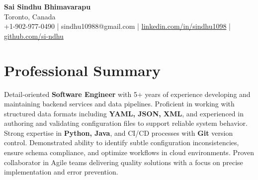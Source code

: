 \documentclass[letterpaper,11pt]{article}
\begin{document}
\begin{center}
  {\Large \textbf{Sai Sindhu Bhimavarapu}} \\
  Toronto, Canada \\
  +1-902-977-0490 \enspace | \enspace sindhu10988@gmail.com \enspace | \enspace \href{https://www.linkedin.com/in/sindhu1098/}{linkedin.com/in/sindhu1098} \enspace | \enspace \href{https://github.com/si-ndhu}{github.com/si-ndhu}
\end{center}

\section{Professional Summary}
  \begin{itemize}[leftmargin=0.15in, label={}]
    \small{\item{
     Detail-oriented \textbf{Software Engineer} with 5+ years of experience developing and maintaining backend services and data pipelines. Proficient in working with structured data formats including \textbf{YAML, JSON, XML}, and experienced in authoring and validating configuration files to support reliable system behavior. Strong expertise in \textbf{Python, Java}, and CI/CD processes with \textbf{Git} version control. Demonstrated ability to identify subtle configuration inconsistencies, ensure schema compliance, and optimize workflows in cloud environments. Proven collaborator in Agile teams delivering quality solutions with a focus on precise implementation and error prevention.
    }}
  \end{itemize}
\vspace{-16pt}

\end{document}
